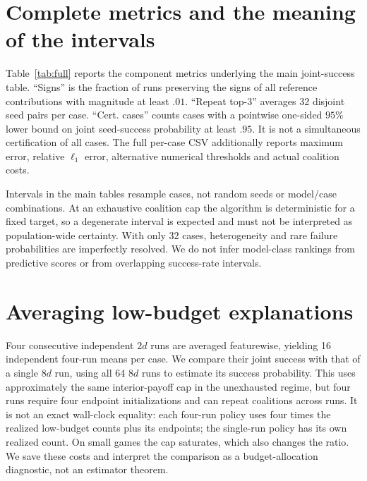 \section{Complete metrics and the meaning of the intervals}
\label{app:metrics}
Table~\ref{tab:full} reports the component metrics underlying the main joint-success table. ``Signs'' is the fraction of runs preserving the signs of all reference contributions with magnitude at least $.01$. ``Repeat top-3'' averages 32 disjoint seed pairs per case. ``Cert. cases'' counts cases with a pointwise one-sided $95\%$ lower bound on joint seed-success probability at least $.95$. It is not a simultaneous certification of all cases. The full per-case CSV additionally reports maximum error, relative $\ell_1$ error, alternative numerical thresholds and actual coalition costs.

Intervals in the main tables resample cases, not random seeds or model/case combinations. At an exhaustive coalition cap the algorithm is deterministic for a fixed target, so a degenerate interval is expected and must not be interpreted as population-wide certainty. With only 32 cases, heterogeneity and rare failure probabilities are imperfectly resolved. We do not infer model-class rankings from predictive scores or from overlapping success-rate intervals.

\begin{table}[t]
\centering\scriptsize

\caption{Complete unregularized Kernel SHAP component success rates (percent), with 32 cases per cell and 64 runs per case. The main text reports case-bootstrap intervals for joint success; machine-readable summaries contain intervals for every component.}
\label{tab:full}
\end{table}

\section{Averaging low-budget explanations}
\label{app:averaging}
Four consecutive independent $2d$ runs are averaged featurewise, yielding 16 independent four-run means per case. We compare their joint success with that of a single $8d$ run, using all 64 $8d$ runs to estimate its success probability. This uses approximately the same interior-payoff cap in the unexhausted regime, but four runs require four endpoint initializations and can repeat coalitions across runs. It is not an exact wall-clock equality: each four-run policy uses four times the realized low-budget counts plus its endpoints; the single-run policy has its own realized count. On small games the cap saturates, which also changes the ratio. We save these costs and interpret the comparison as a budget-allocation diagnostic, not an estimator theorem.

